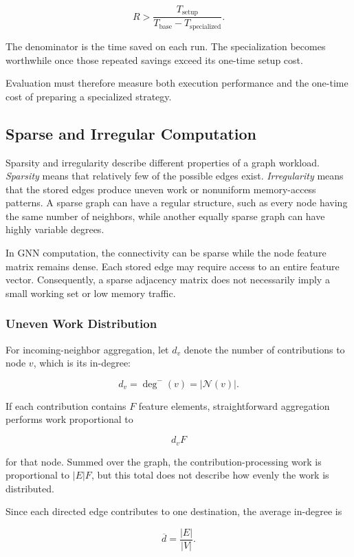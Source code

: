 \[
  R>\frac{T_{\mathrm{setup}}}
  {T_{\mathrm{base}}-T_{\mathrm{specialized}}}.
\]

The denominator is the time saved on each run. The specialization becomes worthwhile once those repeated savings exceed its one-time setup cost.

Evaluation must therefore measure both execution performance and the one-time cost of preparing a specialized strategy.

\subsection{Sparse and Irregular Computation}
\label{sec:sparse-irregular-computation}

Sparsity and irregularity describe different properties of a graph workload. \emph{Sparsity} means that relatively few of the possible edges exist. \emph{Irregularity} means that the stored edges produce uneven work or nonuniform memory-access patterns. A sparse graph can have a regular structure, such as every node having the same number of neighbors, while another equally sparse graph can have highly variable degrees.

In GNN computation, the connectivity can be sparse while the node feature matrix remains dense. Each stored edge may require access to an entire feature vector. Consequently, a sparse adjacency matrix does not necessarily imply a small working set or low memory traffic.

\subsubsection{Uneven Work Distribution}

For incoming-neighbor aggregation, let $d_v$ denote the number of contributions to node $v$, which is its in-degree:

\[
  d_v=\deg^{-}(v)=|\mathcal{N}(v)|.
\]

If each contribution contains $F$ feature elements, straightforward aggregation performs work proportional to

\[
  d_vF
\]

for that node. Summed over the graph, the contribution-processing work is proportional to $|E|F$, but this total does not describe how evenly the work is distributed.

Since each directed edge contributes to one destination, the average in-degree is

\[
  \overline{d}=\frac{|E|}{|V|}.
\]

